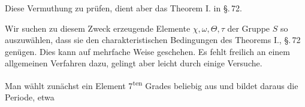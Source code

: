 Diese Vermuthung zu pr\"ufen, dient aber das Theorem I.
in \S.\,72.

Wir suchen zu diesem Zweck erzeugende Elemente $\chi, \omega, \Theta, \tau$
der Gruppe $S$ so auszuw\"ahlen, dass sie den charakteristischen
Bedingungen des Theorems I., \S.\,72 gen\"ugen. Dies kann auf
mehrfache Weise geschehen. Es fehlt freilich an einem allgemeinen
 Verfahren dazu, gelingt aber leicht durch einige Versuche.

Man w\"ahlt zun\"achst ein Element 7\textsuperscript{ten} Grades beliebig aus
und bildet daraus die Periode, etwa
